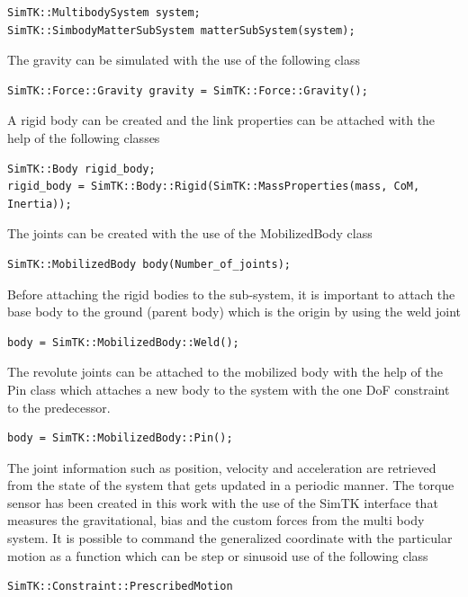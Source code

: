 \begin{verbatim}
SimTK::MultibodySystem system;
SimTK::SimbodyMatterSubSystem matterSubSystem(system);
\end{verbatim}

The gravity can be simulated with the use of the following class

\begin{verbatim}
SimTK::Force::Gravity gravity = SimTK::Force::Gravity();
\end{verbatim}

A rigid body can be created and the link properties can be attached with the help of the following classes

\begin{verbatim}
SimTK::Body rigid_body;
rigid_body = SimTK::Body::Rigid(SimTK::MassProperties(mass, CoM, Inertia));
\end{verbatim}

The joints can be created with the use of the MobilizedBody class

\begin{verbatim}
SimTK::MobilizedBody body(Number_of_joints);
\end{verbatim}

Before attaching the rigid bodies to the sub-system, it is important to attach the base body to the ground (parent body) which is the origin by using the weld joint

\begin{verbatim}
body = SimTK::MobilizedBody::Weld();
\end{verbatim}

The revolute joints can be attached to the mobilized body with the help of the Pin  class which attaches a new body to the system with the one DoF constraint to the predecessor.

\begin{verbatim}
body = SimTK::MobilizedBody::Pin();
\end{verbatim}

The joint information such as position, velocity and acceleration are retrieved from the state of the system that gets updated in a periodic manner. The torque sensor has been created in this work with the use of the SimTK interface that measures the gravitational, bias and the custom forces from the multi body system. It is possible to command the generalized coordinate with the particular motion as a function which can be step or sinusoid use of the following class

\begin{verbatim}
SimTK::Constraint::PrescribedMotion
\end{verbatim}

